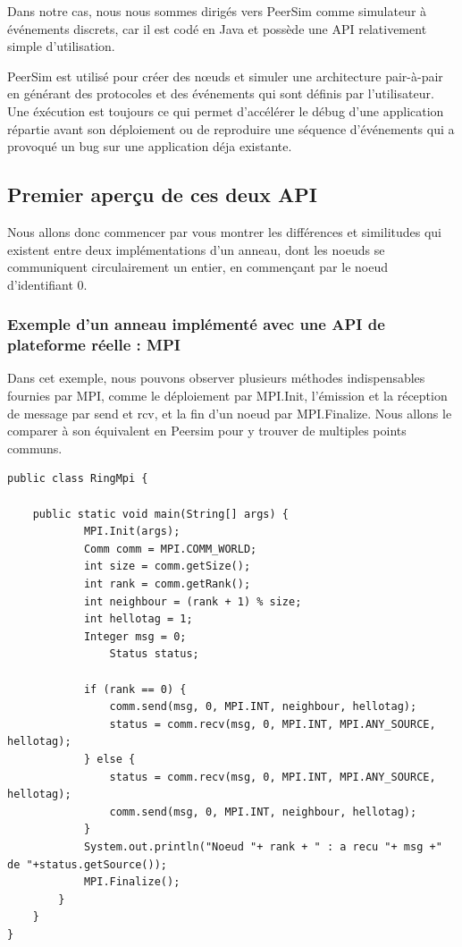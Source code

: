 \documentclass{article}
\begin{document}
					Dans notre cas, nous nous sommes dirigés vers PeerSim comme simulateur à événements discrets, car il est codé en Java et possède une API relativement simple d'utilisation.

					PeerSim est utilisé pour créer des nœuds et simuler une architecture pair-à-pair en générant des protocoles et des événements qui sont définis par l'utilisateur. Une éxécution est toujours ce qui permet d'accélérer le débug d'une application répartie avant son déploiement ou de reproduire une séquence d'événements qui a provoqué un bug sur une application déja existante.

			
			\newpage
			\subsection{Premier aperçu de ces deux API}
			Nous allons donc commencer par vous montrer les différences et similitudes qui existent entre deux implémentations d'un anneau, dont les noeuds se communiquent circulairement un entier, en commençant par le noeud d'identifiant 0. 

			\subsubsection{Exemple d'un anneau implémenté avec une API de plateforme réelle : MPI}
			Dans cet exemple, nous pouvons observer plusieurs méthodes indispensables fournies par MPI, comme le déploiement par MPI.Init, l'émission et la réception de message par send et rcv, et la fin d'un noeud par MPI.Finalize. Nous allons le comparer à son équivalent en Peersim pour y trouver de multiples points communs.
			\begin{lstlisting}
public class RingMpi {

	public static void main(String[] args) {
			MPI.Init(args);
			Comm comm = MPI.COMM_WORLD;
			int size = comm.getSize();
			int rank = comm.getRank();
			int neighbour = (rank + 1) % size;
			int hellotag = 1;
			Integer msg = 0;
           		Status status;
            
			if (rank == 0) {
				comm.send(msg, 0, MPI.INT, neighbour, hellotag);
				status = comm.recv(msg, 0, MPI.INT, MPI.ANY_SOURCE, hellotag);
			} else {
				status = comm.recv(msg, 0, MPI.INT, MPI.ANY_SOURCE, hellotag);
				comm.send(msg, 0, MPI.INT, neighbour, hellotag);
            }
			System.out.println("Noeud "+ rank + " : a recu "+ msg +" de "+status.getSource());
			MPI.Finalize();
		}
	}
}
                	\end{lstlisting}
			
\end{document}
